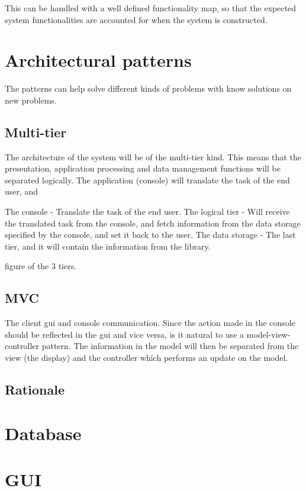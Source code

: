 This can be handled with a well defined functionality map, so that the expected system functionalities are accounted for when the system is constructed. 


\section{Architectural patterns}
The patterns can help solve different kinds of problems with know solutions on new problems.

\subsection{Multi-tier}

The architecture of the system will be of the multi-tier kind. This means that the presentation, application processing and data management functions will be separated logically. The application (console) will translate the task of the end user, and 

The console - Translate the task of the end user.
The logical tier - Will receive the translated task from the console, and fetch information from the data storage specified by the console, and set it back to the user.
The data storage - The last tier, and it will contain the information from the library.

figure of the 3 tiers. 

\subsection{MVC}

The client gui and console communication. Since the action made in the console should be reflected in the gui and vice versa, is it natural to use a model-view-controller pattern. The information in the model will then be separated from the view (the display) and the controller which performs an update on the model. 


\subsection{Rationale}


\section{Database}
\section{GUI}

